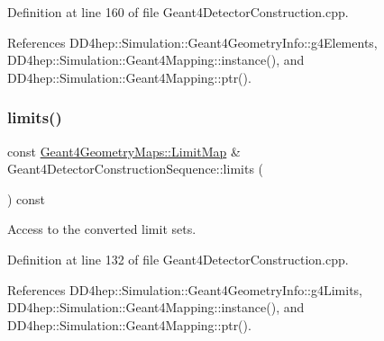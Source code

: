 Definition at line 160 of file Geant4\+Detector\+Construction.\+cpp.



References D\+D4hep\+::\+Simulation\+::\+Geant4\+Geometry\+Info\+::g4\+Elements, D\+D4hep\+::\+Simulation\+::\+Geant4\+Mapping\+::instance(), and D\+D4hep\+::\+Simulation\+::\+Geant4\+Mapping\+::ptr().

\hypertarget{class_d_d4hep_1_1_simulation_1_1_geant4_detector_construction_sequence_a21deeed65cfa08243f036839f4597556}{}\label{class_d_d4hep_1_1_simulation_1_1_geant4_detector_construction_sequence_a21deeed65cfa08243f036839f4597556} 
\subsubsection{\texorpdfstring{limits()}{limits()}}
{\footnotesize\ttfamily const \hyperlink{namespace_d_d4hep_1_1_simulation_1_1_geant4_geometry_maps_a338013d6709b82358b8e2490cdba0ed2}{Geant4\+Geometry\+Maps\+::\+Limit\+Map} \& Geant4\+Detector\+Construction\+Sequence\+::limits (\begin{DoxyParamCaption}{ }\end{DoxyParamCaption}) const}



Access to the converted limit sets. 



Definition at line 132 of file Geant4\+Detector\+Construction.\+cpp.



References D\+D4hep\+::\+Simulation\+::\+Geant4\+Geometry\+Info\+::g4\+Limits, D\+D4hep\+::\+Simulation\+::\+Geant4\+Mapping\+::instance(), and D\+D4hep\+::\+Simulation\+::\+Geant4\+Mapping\+::ptr().

\hypertarget{class_d_d4hep_1_1_simulation_1_1_geant4_detector_construction_sequence_ab22110a855dc4c9956ded5d347782c14}{}\label{class_d_d4hep_1_1_simulation_1_1_geant4_detector_construction_sequence_ab22110a855dc4c9956ded5d347782c14} 
